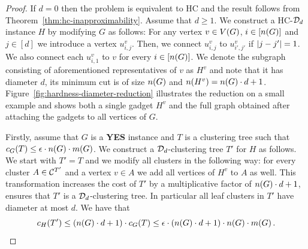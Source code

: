 \begin{proof}
    If $d=0$ then the problem is equivalent to \textsc{HC} and the result follows from Theorem~\ref{thm:hc-inapproximability}. Assume that $d\geq 1$. We construct a \textsc{HC-$\mathcal{D}_d$} instance $H$ by modifying $G$ as follows: For any vertex $v\in V\mathopen{}\left( G \right)$, $i\in [n\mathopen{}\left( G \right)]$ and $j\in [d]$ we introduce a vertex $u_{i,j}^v$. Then, we connect $u_{i,j}^v$ to $u_{i',j'}^v$ if $\mathopen{}\left| j-j' \right|=1$. We also connect each $u_{i, 1}^v$ to $v$ for every $i\in [n\mathopen{}\left( G \right)]$. We denote the subgraph consisting of aforementioned representatives of $v$ as $H^v$ and note that it has diameter $d$, its minimum cut is of size $n\mathopen{}\left( G \right)$ and $n\mathopen{}\left( H^v \right)=n\mathopen{}\left( G \right)\cdot d +1$.
    Figure~\ref{fig:hardness-diameter-reduction} illustrates the reduction on a small example and shows both a single gadget $H^v$ and the full graph obtained after attaching the gadgets to all vertices of $G$.

    

    Firstly, assume that $G$ is a \textbf{YES} instance and $T$ is a clustering tree such that ${c}_G\mathopen{}\left( T \right)\leq \epsilon \cdot n\mathopen{}\left( G \right) \cdot m\mathopen{}\left( G \right)$. We construct a $\mathcal{D}_d$-clustering tree $T'$ for $H$ as follows. We start with $T'=T$ and we modify all clusters in the following way: for every cluster $A\in \mathcal{C}^{T'}$ and a vertex $v\in A$ we add all vertices of $H^v$ to $A$ as well. This transformation increases the cost of $T'$ by a multiplicative factor of $n\mathopen{}\left( G \right)\cdot d+1$, ensures that $T'$ is a $\mathcal{D}_d$-clustering tree. In particular all leaf clusters in $T'$ have diameter at most $d$. We have that \[
    {c}_H\mathopen{}\left( T' \right) \leq \mathopen{}\left( n\mathopen{}\left( G \right)\cdot d+1 \right)\cdot{c}_G\mathopen{}\left( T \right)\leq \epsilon \cdot \mathopen{}\left( n\mathopen{}\left( G \right)\cdot d+1 \right)\cdot n\mathopen{}\left( G \right)\cdot m\mathopen{}\left( G \right).
    \]


\end{proof}
